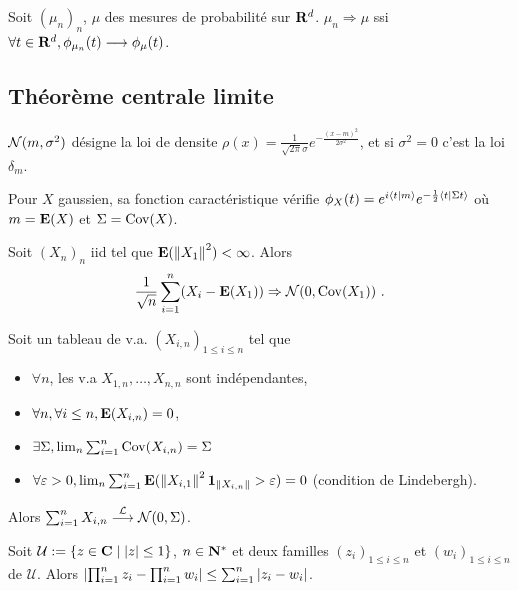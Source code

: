	\begin{thm}[de Lévy]
		Soit $(\mu_n)_n$, $\mu$ des mesures de probabilité sur $\mathbf{R}^d$.
		$\mu_n \Rightarrow \mu$ ssi $\forall t \in \mathbf{R}^d, \phi_{\mu_n}(t) \longrightarrow \phi_\mu(t)$.
	\end{thm}


\subsection{Théorème centrale limite}

	\begin{note}
		$\mathcal{N}(m,\sigma^2)$ désigne la loi de densite $\rho(x) = \frac{1}{\sqrt{2\pi} \sigma} e^{-\frac{(x - m)^2}{2 \sigma^2}}$, et si $\sigma^2 = 0$ c'est la loi $\delta_m$.
	\end{note}

	Pour $X$ gaussien, sa fonction caractéristique vérifie $\phi_X(t) = e^{i\left\langle t \mid m \right\rangle} e^{-\frac{1}{2} \left\langle t \mid \Sigma t \right\rangle}$ où $m = \mathbf{E}(X)$ et $\Sigma = \operatorname{Cov}(X)$.
	
	\begin{thm}
		Soit $(X_n)_n$ iid tel que $\mathbf{E}(\left\lVert X_1\right\rVert^2) < \infty$.
		Alors
		$$\frac{1}{\sqrt{n}} \sum_{i = 1}^n (X_i - \esp(X_1)) \Rightarrow \normale(0,\Cov(X_1))\ .$$
	\end{thm}

	\begin{thm}[de Linderbergh]
		Soit un tableau de v.a. $(X_{i,n})_{1 \leq i \leq n}$ tel que
		\begin{itemize}
			\item[\textbullet] $\forall n$, les v.a $X_{1,n},\ldots,X_{n,n}$ sont indépendantes,
			\item[\textbullet] $\forall n, \forall i \leq n, \mathbf{E}(X_{i,n}) = 0$,
			\item[\textbullet] $\exists \Sigma, \lim_n \sum_{i = 1}^n \operatorname{Cov}(X_{i,n}) = \Sigma$
			\item[\textbullet] $\forall \varepsilon > 0, \lim_n \sum_{i = 1}^n \mathbf{E}(\left\lVert X_{i,1}\right\rVert^2 \operatorname{\mathbf{1}}_{\left\lVert X_{i,n}\right\rVert} > \varepsilon) = 0$ (condition de Lindebergh).
		\end{itemize}
		Alors $\sum_{i = 1}^n X_{i,n} \overset{\mathcal{L}}{\longrightarrow} \mathcal{N}(0,\Sigma)$.
	\end{thm}
 
	\begin{lem}
		Soit $\mathcal{U} := \{ z \in \mathbf{C} \mid \left\lvert z\right\rvert \leq 1 \}$, $n \in \mathbf{N}^*$ et deux familles $(z_i)_{1 \leq i \leq n}$ et $(w_i)_{1 \leq i \leq n}$ de $\mathcal{U}$.
		Alors $\left\lvert \prod_{i = 1}^n z_i - \prod_{i = 1}^n w_i \right\rvert \leq \sum_{i = 1}^n \left\lvert z_i - w_i\right\rvert$.
	\end{lem}
